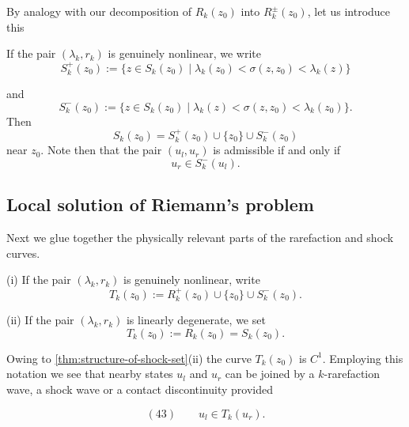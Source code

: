 By analogy with our decomposition of $R_k(z_0)$ into $R_k^\pm(z_0)$, let us introduce this

\begin{definition}[$S_k^+$ and $S_k^-$]
\label{def:shock-set-plus-minus}
If the pair $(\lambda_k, r_k)$ is genuinely nonlinear, we write
$$S_k^+(z_0) := \{z\in S_k(z_0) \mid \lambda_k(z_0) < \sigma(z,z_0) < \lambda_k(z)\}$$

\begin{figure}[h]\centering
\end{figure}

and
$$S_k^-(z_0) := \{z\in S_k(z_0) \mid \lambda_k(z) < \sigma(z,z_0) < \lambda_k(z_0)\}.$$
Then
$$S_k(z_0) = S_k^+(z_0) \cup \{z_0\} \cup S_k^-(z_0)$$
near $z_0$. Note then that the pair $(u_l, u_r)$ is admissible if and only if
$$u_r \in S_k^-(u_l).$$
\end{definition}

\subsection{Local solution of Riemann's problem}\label{sec:local-solution-riemanns-problem}

Next we glue together the physically relevant parts of the rarefaction and shock curves.

\begin{definition}
\label{def:t-curve}
(i) If the pair $(\lambda_k, r_k)$ is genuinely nonlinear, write
$$T_k(z_0) := R_k^+(z_0) \cup \{z_0\} \cup S_k^-(z_0).$$

(ii) If the pair $(\lambda_k, r_k)$ is linearly degenerate, we set
$$T_k(z_0) := R_k(z_0) = S_k(z_0).$$
\end{definition}

Owing to \cref{thm:structure-of-shock-set}(ii) the curve $T_k(z_0)$ is $C^1$. Employing this notation we see that nearby states $u_l$ and $u_r$ can be joined by a $k$-rarefaction wave, a shock wave or a contact discontinuity provided

$$(43) \qquad u_l \in T_k(u_r).$$

